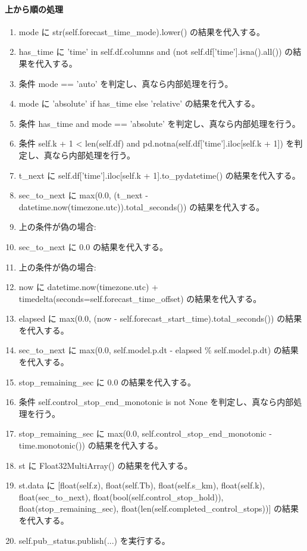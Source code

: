 \documentclass[a4paper,11pt]{article}
\begin{document}
            \paragraph{上から順の処理}
            \begin{enumerate}[leftmargin=1.8em]
            \item mode に str(self.forecast\_time\_mode).lower() の結果を代入する。
\item has\_time に 'time' in self.df.columns and (not self.df['time'].isna().all()) の結果を代入する。
\item 条件 mode == 'auto' を判定し、真なら内部処理を行う。
\item   mode に 'absolute' if has\_time else 'relative' の結果を代入する。
\item 条件 has\_time and mode == 'absolute' を判定し、真なら内部処理を行う。
\item   条件 self.k + 1 < len(self.df) and pd.notna(self.df['time'].iloc[self.k + 1]) を判定し、真なら内部処理を行う。
\item     t\_next に self.df['time'].iloc[self.k + 1].to\_pydatetime() の結果を代入する。
\item     sec\_to\_next に max(0.0, (t\_next - datetime.now(timezone.utc)).total\_seconds()) の結果を代入する。
\item     上の条件が偽の場合:
\item     sec\_to\_next に 0.0 の結果を代入する。
\item   上の条件が偽の場合:
\item   now に datetime.now(timezone.utc) + timedelta(seconds=self.forecast\_time\_offset) の結果を代入する。
\item   elapsed に max(0.0, (now - self.forecast\_start\_time).total\_seconds()) の結果を代入する。
\item   sec\_to\_next に max(0.0, self.model.p.dt - elapsed \% self.model.p.dt) の結果を代入する。
\item stop\_remaining\_sec に 0.0 の結果を代入する。
\item 条件 self.control\_stop\_end\_monotonic is not None を判定し、真なら内部処理を行う。
\item   stop\_remaining\_sec に max(0.0, self.control\_stop\_end\_monotonic - time.monotonic()) の結果を代入する。
\item st に Float32MultiArray() の結果を代入する。
\item st.data に [float(self.z), float(self.Tb), float(self.s\_km), float(self.k), float(sec\_to\_next), float(bool(self.control\_stop\_hold)), float(stop\_remaining\_sec), float(len(self.completed\_control\_stops))] の結果を代入する。
\item self.pub\_status.publish(...) を実行する。
            \end{enumerate}
\end{document}
